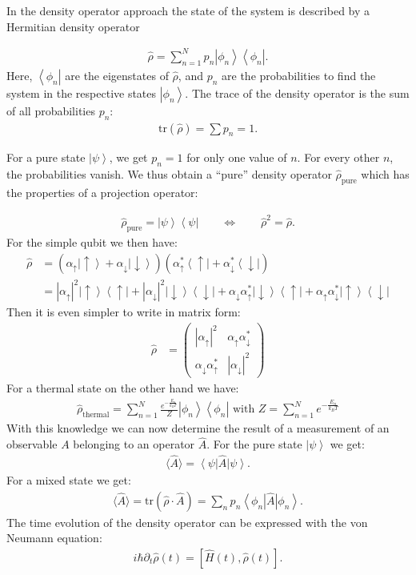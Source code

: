 \documentclass[10pt]{article}
\newcommand{\bra}[1]{\ensuremath{\left\langle#1\right|}}
\newcommand{\ket}[1]{\ensuremath{\left|#1\right\rangle}}
\newcommand{\rhohat}{\hat{\rho}}
\newcommand{\tr}[1]{\mathrm{tr}(#1)}
\begin{document}
In the density operator approach the state of the system is described by a Hermitian density operator

\begin{align}
 \hat{\rho} = \sum_{n=1}^N p_n \ket{\phi_n}\bra{\phi_n}.
\end{align}
Here, $\bra{\phi_n}$ are the eigenstates of $\hat{\rho}$, and $p_n$ are the probabilities to find the system in the respective states $\ket{\phi_n}$. The trace of the density operator is the sum of all probabilities $p_n$:
\begin{align}
  \tr{\rhohat} = \sum p_n = 1.
\end{align}

For a pure state $\ket{\psi}$, we get $p_n=1$ for only one value of $n$. For every other $n$, the probabilities vanish. We thus obtain a ``pure'' density operator $\rhohat_{\text{pure}}$ which has the properties of a projection operator:

\begin{align}
\rhohat_{\text{pure}} = \ket{\psi}\bra{\psi} \qquad \Longleftrightarrow \qquad \rhohat^2 = \rhohat.
\end{align}
For the simple qubit we then have:
\begin{align}
  \rhohat &= \left(\alpha_\uparrow\ket{\uparrow}+\alpha_\downarrow\ket{\downarrow}\right)\left(\alpha_\uparrow^*\bra{\uparrow}+\alpha_\downarrow^*\bra{\downarrow}\right)\\
  &= |\alpha_\uparrow|^2\ket{\uparrow}\bra{\uparrow}+|\alpha_\downarrow|^2\ket{\downarrow}\bra{\downarrow}+\alpha_\downarrow\alpha_\uparrow^*\ket{\downarrow}\bra{\uparrow}+\alpha_\uparrow\alpha_\downarrow^*\ket{\uparrow}\bra{\downarrow}
\end{align}
Then it is even simpler to write in matrix form:
\begin{align}
  \rhohat &= \left(\begin{array}{cc}
  |\alpha_\uparrow|^2&\alpha_\uparrow\alpha_\downarrow^*\\
  \alpha_\downarrow\alpha_\uparrow^*&|\alpha_\downarrow|^2
  \end{array}\right)
\end{align}
For a thermal state on the other hand we have:
\begin{align}
\rhohat_{\text{thermal}} = \sum_{n=1}^N \frac{e^{-\frac{E_n}{k_BT}}}{Z} \ket{\phi_n}\bra{\phi_n}\text{ with }Z = \sum_{n=1}^N e^{-\frac{E_n}{k_BT}}
\end{align}
With this knowledge we can now determine the result of a measurement of an observable $A$ belonging to an operator $\hat{A}$. For the pure state $\ket{\psi}$ we get:
%
\begin{align}
\langle \hat{A}\rangle = \bra{\psi} \hat{A} \ket{\psi}.
\end{align}
%
For a mixed state we get:
%
\begin{align}
\langle \hat{A}\rangle = \tr{\rhohat \cdot \hat{A}} = \sum_n {p_n} \bra{\phi_n} \hat{A} \ket{\phi_n}.
\end{align}
The time evolution of the density operator can be expressed with the von Neumann equation:
\begin{align}
i\hbar \partial_{t}\rhohat(t) = [\hat{H}(t),\rhohat(t)].
\end{align}
\end{document}
